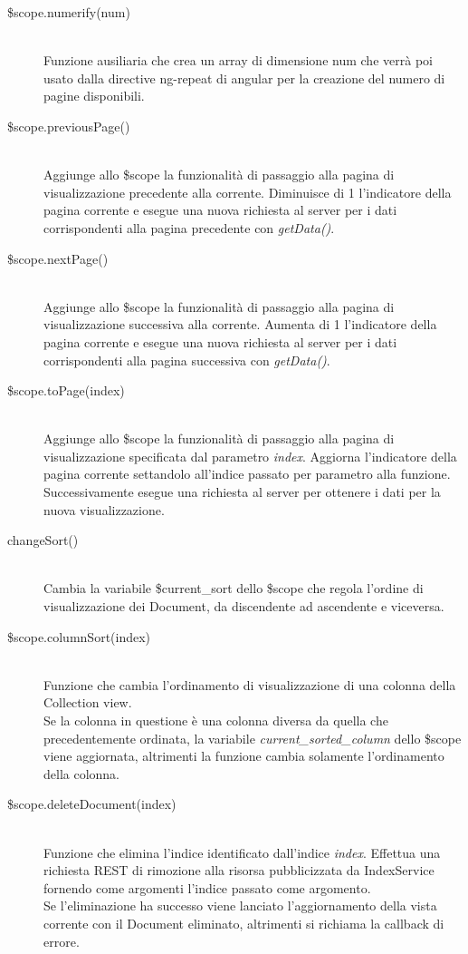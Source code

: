 \begin{description}
\begin{description}
  \item[\$scope.numerify(num)] \hfill \\
   Funzione ausiliaria che crea un array di dimensione   {num} che verrà poi usato dalla directive ng-repeat di angular per la creazione del 
   numero di pagine  disponibili.
  
  \item[\$scope.previousPage()] \hfill \\
  Aggiunge allo \$scope la funzionalità di passaggio alla pagina di visualizzazione precedente alla corrente.
  Diminuisce di 1 l'indicatore della pagina corrente e esegue una nuova richiesta al server per i dati corrispondenti
  alla pagina precedente con \emph{getData()}.
  
  \item[\$scope.nextPage()] \hfill \\
  Aggiunge allo \$scope la funzionalità di passaggio alla pagina di visualizzazione successiva alla corrente.
  Aumenta di 1 l'indicatore della pagina corrente e esegue una nuova richiesta al server per i dati corrispondenti
  alla pagina successiva con \emph{getData()}.
  
  \item[\$scope.toPage(index)] \hfill \\
  Aggiunge allo \$scope la funzionalità di passaggio alla pagina di visualizzazione specificata dal parametro \emph{index}.
  Aggiorna l'indicatore della pagina corrente settandolo all'indice passato per parametro alla funzione.
  Successivamente esegue una richiesta al server per ottenere i dati per la nuova visualizzazione.
  
  \item[changeSort()] \hfill \\
  Cambia la variabile \$current\_sort dello \$scope che regola l'ordine di visualizzazione dei Document, da discendente ad
  ascendente e viceversa.
  
  \item[\$scope.columnSort(index)] \hfill \\
  Funzione che cambia l'ordinamento di visualizzazione di una colonna della Collection view. \\
  Se la colonna in questione è una colonna diversa da quella che precedentemente ordinata,
  la variabile \emph{current\_sorted\_column} dello \$scope viene aggiornata, altrimenti la funzione cambia solamente
  l'ordinamento della colonna.
  
  \item[\$scope.deleteDocument(index)] \hfill \\
  Funzione che elimina l'indice identificato dall'indice \emph{index}. Effettua una richiesta REST di rimozione alla risorsa
  pubblicizzata da IndexService fornendo come argomenti l'indice passato come argomento. \\
  Se l'eliminazione ha successo viene lanciato l'aggiornamento della vista corrente con il Document eliminato, altrimenti si
  richiama la callback di errore.
  
 \end{description}
\end{description}


